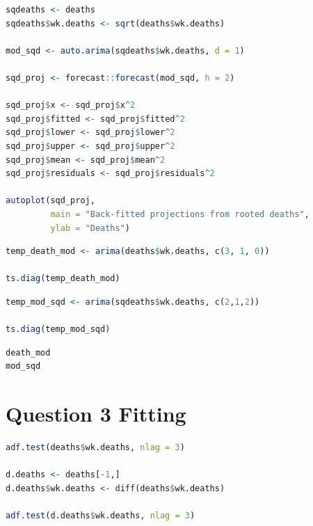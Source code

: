 \documentclass[a4paper]{article}
\begin{document}
\begin{lstlisting}[language=r,label=lst:org1875317,caption={Question 3: Projections of deaths using backfitted ARIMA model},captionpos=b,numbers=none]
sqdeaths <- deaths
sqdeaths$wk.deaths <- sqrt(deaths$wk.deaths)

mod_sqd <- auto.arima(sqdeaths$wk.deaths, d = 1)

sqd_proj <- forecast::forecast(mod_sqd, h = 2)

sqd_proj$x <- sqd_proj$x^2
sqd_proj$fitted <- sqd_proj$fitted^2
sqd_proj$lower <- sqd_proj$lower^2
sqd_proj$upper <- sqd_proj$upper^2
sqd_proj$mean <- sqd_proj$mean^2
sqd_proj$residuals <- sqd_proj$residuals^2

autoplot(sqd_proj,
         main = "Back-fitted projections from rooted deaths",
         ylab = "Deaths")
\end{lstlisting}

\begin{lstlisting}[language=r,label=lst:org7a97f27,caption={Question 3: Visual residuals testing for base model},captionpos=b,numbers=none]
temp_death_mod <- arima(deaths$wk.deaths, c(3, 1, 0))

ts.diag(temp_death_mod)
\end{lstlisting}


\begin{lstlisting}[language=r,label=lst:org1aea790,caption={Question 3: Visual residuals testing for back-fitted model},captionpos=b,numbers=none]
temp_mod_sqd <- arima(sqdeaths$wk.deaths, c(2,1,2))

ts.diag(temp_mod_sqd)
\end{lstlisting}

\begin{lstlisting}[language=r,label=lst:org5989d79,caption={Question 3: Model values},captionpos=b,numbers=none]
death_mod
mod_sqd
\end{lstlisting}
\section{Question 3 Fitting}
\label{sec:orgae228c6}
\begin{lstlisting}[language=r,label=lst:org67d242e,caption={Question 3: Stationarity testing},captionpos=b,numbers=none]
adf.test(deaths$wk.deaths, nlag = 3)

d.deaths <- deaths[-1,]
d.deaths$wk.deaths <- diff(deaths$wk.deaths)

adf.test(d.deaths$wk.deaths, nlag = 3)
\end{lstlisting}
\end{document}
